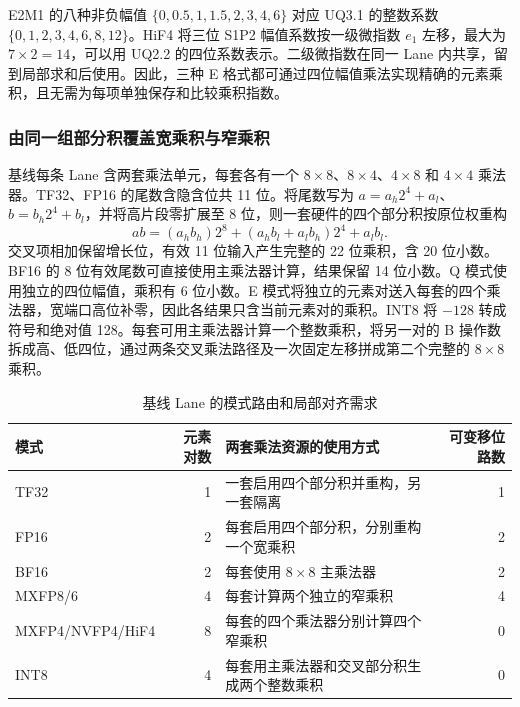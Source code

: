 \documentclass[10.5pt,compsoc,UTF8]{CjC}
\begin{document}
E2M1 的八种非负幅值 $\{0,0.5,1,1.5,2,3,4,6\}$ 对应 UQ3.1 的整数系数 $\{0,1,2,3,4,6,8,12\}$。HiF4 将三位 S1P2 幅值系数按一级微指数 $e_1$ 左移，最大为 $7\times2=14$，可以用 UQ2.2 的四位系数表示。二级微指数在同一 Lane 内共享，留到局部求和后使用。因此，三种 E 格式都可通过四位幅值乘法实现精确的元素乘积，且无需为每项单独保存和比较乘积指数。

\subsubsection{由同一组部分积覆盖宽乘积与窄乘积}

基线每条 Lane 含两套乘法单元，每套各有一个 $8\times8$、$8\times4$、$4\times8$ 和 $4\times4$ 乘法器。TF32、FP16 的尾数含隐含位共 11 位。将尾数写为 $a=a_h2^4+a_l$、$b=b_h2^4+b_l$，并将高片段零扩展至 8 位，则一套硬件的四个部分积按原位权重构
\begin{equation}
  ab=(a_hb_h)2^8+(a_hb_l+a_lb_h)2^4+a_lb_l .
  \label{eq:mul-reconstruct}
\end{equation}
交叉项相加保留增长位，有效 11 位输入产生完整的 22 位乘积，含 20 位小数。BF16 的 8 位有效尾数可直接使用主乘法器计算，结果保留 14 位小数。Q 模式使用独立的四位幅值，乘积有 6 位小数。E 模式将独立的元素对送入每套的四个乘法器，宽端口高位补零，因此各结果只含当前元素对的乘积。INT8 将 $-128$ 转成符号和绝对值 128。每套可用主乘法器计算一个整数乘积，将另一对的 B 操作数拆成高、低四位，通过两条交叉乘法路径及一次固定左移拼成第二个完整的 $8\times8$ 乘积。

\begin{table}[!htbp]
\centering
\caption{基线 Lane 的模式路由和局部对齐需求}
\label{tab:lane-routing}
\begin{tabularx}{\linewidth}{@{}lrYr@{}}
\toprule
模式 & 元素对数 & 两套乘法资源的使用方式 & 可变移位路数 \\
\midrule
TF32 & 1 & 一套启用四个部分积并重构，另一套隔离 & 1 \\
FP16 & 2 & 每套启用四个部分积，分别重构一个宽乘积 & 2 \\
BF16 & 2 & 每套使用 $8\times8$ 主乘法器 & 2 \\
MXFP8/6 & 4 & 每套计算两个独立的窄乘积 & 4 \\
MXFP4/NVFP4/HiF4 & 8 & 每套的四个乘法器分别计算四个窄乘积 & 0 \\
INT8 & 4 & 每套用主乘法器和交叉部分积生成两个整数乘积 & 0 \\
\bottomrule
\end{tabularx}
\end{table}
\end{document}
